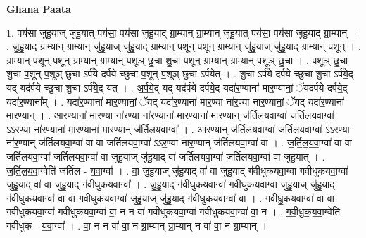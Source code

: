 \documentclass[17pt]{extarticle}
\begin{document}
\textbf{Ghana Paata } \newline

1. पय॑सा जुहु॒याज् जु॑हु॒यात् पय॑सा॒ पय॑सा जुहु॒याद् ग्रा॒म्यान् ग्रा॒म्यान् जु॑हु॒यात् पय॑सा॒ पय॑सा जुहु॒याद् ग्रा॒म्यान् । . जु॒हु॒याद् ग्रा॒म्यान् ग्रा॒म्यान् जु॑हु॒याज् जु॑हु॒याद् ग्रा॒म्यान् प॒शून् प॒शून् ग्रा॒म्यान् जु॑हु॒याज् जु॑हु॒याद् ग्रा॒म्यान् प॒शून् । . ग्रा॒म्यान् प॒शून् प॒शून् ग्रा॒म्यान् ग्रा॒म्यान् प॒शूञ् छु॒चा शु॒चा प॒शून् ग्रा॒म्यान् ग्रा॒म्यान् प॒शूञ् छु॒चा । . प॒शूञ् छु॒चा शु॒चा प॒शून् प॒शूञ् छु॒चा ऽर्प॑ये दर्पये च्छु॒चा प॒शून् प॒शूञ् छु॒चा ऽर्प॑येत् । . शु॒चा ऽर्प॑ये दर्पये च्छु॒चा शु॒चा ऽर्प॑ये॒द् यद् यद॑र्पये च्छु॒चा शु॒चा ऽर्प॑ये॒द् यत् । . अ॒र्प॒ये॒द् यद् यद॑र्पये दर्पये॒द् यदा॑र॒ण्याना॑ मार॒ण्यानां॒ ॅयद॑र्पये दर्पये॒द् यदा॑र॒ण्याना᳚म् । . यदा॑र॒ण्याना॑ मार॒ण्यानां॒ ॅयद् यदा॑र॒ण्याना॑ मार॒ण्या ना॑र॒ण्या ना॑र॒ण्यानां॒ ॅयद् यदा॑र॒ण्याना॑ मार॒ण्यान् । . आ॒र॒ण्याना॑ मार॒ण्या ना॑र॒ण्या ना॑र॒ण्याना॑ मार॒ण्याना॑ मार॒ण्यान् ज॑र्तिलयवा॒ग्वा॑ जर्तिलयवा॒ग्वा॑ ऽऽर॒ण्या ना॑र॒ण्याना॑ मार॒ण्याना॑ मार॒ण्यान् ज॑र्तिलयवा॒ग्वा᳚ । . आ॒र॒ण्यान् ज॑र्तिलयवा॒ग्वा॑ जर्तिलयवा॒ग्वा॑ ऽऽर॒ण्या ना॑र॒ण्यान् ज॑र्तिलयवा॒ग्वा॑ वा वा जर्तिलयवा॒ग्वा॑ ऽऽर॒ण्या ना॑र॒ण्यान् ज॑र्तिलयवा॒ग्वा॑ वा । . ज॒र्ति॒ल॒य॒वा॒ग्वा॑ वा वा जर्तिलयवा॒ग्वा॑ जर्तिलयवा॒ग्वा॑ वा जुहु॒याज् जु॑हु॒याद् वा॑ जर्तिलयवा॒ग्वा॑ जर्तिलयवा॒ग्वा॑ वा जुहु॒यात् । . ज॒र्ति॒ल॒य॒वा॒ग्वेति॑ जर्तिल - य॒वा॒ग्वा᳚ । . वा॒ जु॒हु॒याज् जु॑हु॒याद् वा॑ वा जुहु॒याद् ग॑वीधुकयवा॒ग्वा॑ गवीधुकयवा॒ग्वा॑ जुहु॒याद् वा॑ वा जुहु॒याद् ग॑वीधुकयवा॒ग्वा᳚ । . जु॒हु॒याद् ग॑वीधुकयवा॒ग्वा॑ गवीधुकयवा॒ग्वा॑ जुहु॒याज् जु॑हु॒याद् ग॑वीधुकयवा॒ग्वा॑ वा वा गवीधुकयवा॒ग्वा॑ जुहु॒याज् जु॑हु॒याद् ग॑वीधुकयवा॒ग्वा॑ वा । . ग॒वी॒धु॒क॒य॒वा॒ग्वा॑ वा वा गवीधुकयवा॒ग्वा॑ गवीधुकयवा॒ग्वा॑ वा॒ न न वा॑ गवीधुकयवा॒ग्वा॑ गवीधुकयवा॒ग्वा॑ वा॒ न । . ग॒वी॒धु॒क॒य॒वा॒ग्वेति॑ गवीधुक - य॒वा॒ग्वा᳚ । . वा॒ न न वा॑ वा॒ न ग्रा॒म्यान् ग्रा॒म्यान् न वा॑ वा॒ न ग्रा॒म्यान् । \newline
\end{document}
